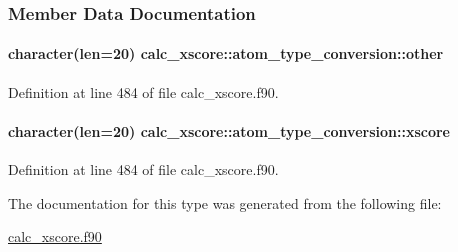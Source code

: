 \subsubsection{Member Data Documentation}
\hypertarget{structcalc__xscore_1_1atom__type__conversion_a4dbde22246ac6bcdd114cdb1aa521f3b}{
\paragraph[{other}]{\setlength{\rightskip}{0pt plus 5cm}character(len=20) calc\-\_\-xscore\-::atom\-\_\-type\-\_\-conversion\-::other}}\label{structcalc__xscore_1_1atom__type__conversion_a4dbde22246ac6bcdd114cdb1aa521f3b}


Definition at line 484 of file calc\-\_\-xscore.\-f90.

\hypertarget{structcalc__xscore_1_1atom__type__conversion_a87864904b96a20073f423b3809f1b89b}{
\paragraph[{xscore}]{\setlength{\rightskip}{0pt plus 5cm}character(len=20) calc\-\_\-xscore\-::atom\-\_\-type\-\_\-conversion\-::xscore}}\label{structcalc__xscore_1_1atom__type__conversion_a87864904b96a20073f423b3809f1b89b}


Definition at line 484 of file calc\-\_\-xscore.\-f90.



The documentation for this type was generated from the following file\-:\begin{DoxyCompactItemize}
\item 
\hyperlink{calc__xscore_8f90}{calc\-\_\-xscore.\-f90}\end{DoxyCompactItemize}
